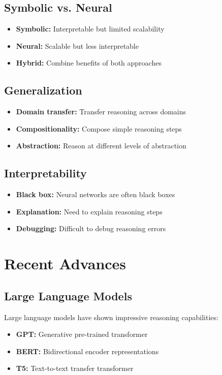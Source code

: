 \subsection{Symbolic vs. Neural}

\begin{itemize}
    \item \textbf{Symbolic:} Interpretable but limited scalability
    \item \textbf{Neural:} Scalable but less interpretable
    \item \textbf{Hybrid:} Combine benefits of both approaches
\end{itemize}

\subsection{Generalization}

\begin{itemize}
    \item \textbf{Domain transfer:} Transfer reasoning across domains
    \item \textbf{Compositionality:} Compose simple reasoning steps
    \item \textbf{Abstraction:} Reason at different levels of abstraction
\end{itemize}

\subsection{Interpretability}

\begin{itemize}
    \item \textbf{Black box:} Neural networks are often black boxes
    \item \textbf{Explanation:} Need to explain reasoning steps
    \item \textbf{Debugging:} Difficult to debug reasoning errors
\end{itemize}

\section{Recent Advances}

\subsection{Large Language Models}

Large language models have shown impressive reasoning capabilities:
\begin{itemize}
    \item \textbf{GPT:} Generative pre-trained transformer
    \item \textbf{BERT:} Bidirectional encoder representations
    \item \textbf{T5:} Text-to-text transfer transformer
\end{itemize}

